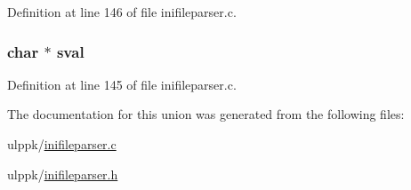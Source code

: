 Definition at line 146 of file inifileparser.\-c.

\hypertarget{union_y_y_s_t_y_p_e_a461aa6611ed9ae4e07657fc605de5859}{
\subsubsection[{sval}]{\setlength{\rightskip}{0pt plus 5cm}char $\ast$ sval}}\label{union_y_y_s_t_y_p_e_a461aa6611ed9ae4e07657fc605de5859}


Definition at line 145 of file inifileparser.\-c.



The documentation for this union was generated from the following files\-:\begin{DoxyCompactItemize}
\item 
ulppk/\hyperlink{inifileparser_8c}{inifileparser.\-c}\item 
ulppk/\hyperlink{inifileparser_8h}{inifileparser.\-h}\end{DoxyCompactItemize}

